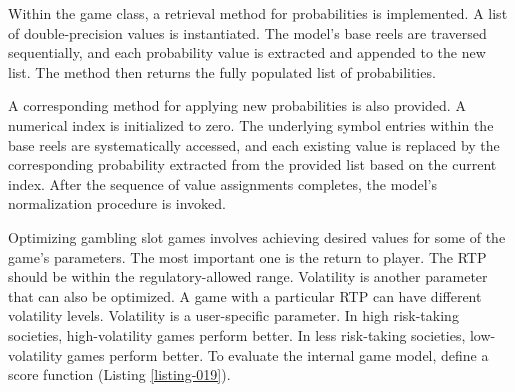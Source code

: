 \documentclass[12pt,twoside,openany]{book}
\begin{document}
Within the game class, a retrieval method for probabilities is implemented. A list of double-precision values is instantiated. The model's base reels are traversed sequentially, and each probability value is extracted and appended to the new list. The method then returns the fully populated list of probabilities.

A corresponding method for applying new probabilities is also provided. A numerical index is initialized to zero. The underlying symbol entries within the base reels are systematically accessed, and each existing value is replaced by the corresponding probability extracted from the provided list based on the current index. After the sequence of value assignments completes, the model's normalization procedure is invoked.

Optimizing gambling slot games involves achieving desired values for some of the game's parameters. The most important one is the return to player. The RTP should be within the regulatory-allowed range. Volatility is another parameter that can also be optimized. A game with a particular RTP can have different volatility levels. Volatility is a user-specific parameter. In high risk-taking societies, high-volatility games perform better. In less risk-taking societies, low-volatility games perform better. To evaluate the internal game model, define a score function (Listing \ref{listing-019}).
\end{document}
